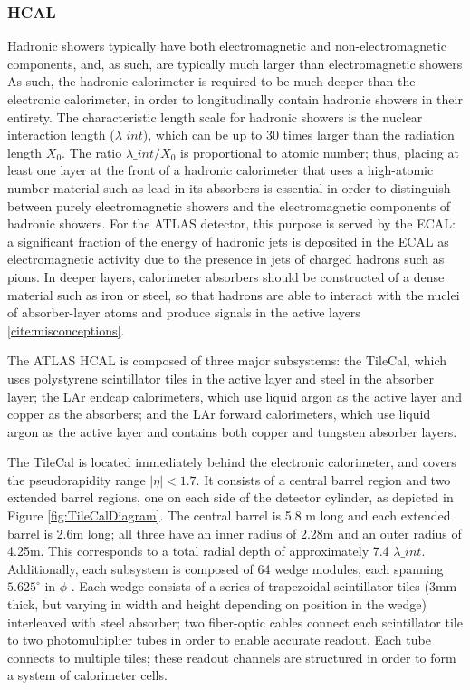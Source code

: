 \subsubsection{HCAL} \label{sec:HCAL} 

Hadronic showers typically have both electromagnetic and non-electromagnetic components, and, as such, are typically much larger than electromagnetic showers  As such, the hadronic calorimeter is required to be much deeper than the electronic calorimeter, in order to longitudinally contain hadronic showers in their entirety. The characteristic length scale for hadronic showers is the nuclear interaction length ($\lambda\_{int}$), which can be up to 30 times larger than the radiation length $X_0$. The ratio $\lambda\_{int} / X_0 $ is proportional to atomic number; thus, placing at least one layer at the front of a hadronic calorimeter that uses a high-atomic number material such as lead in its absorbers is essential in order to distinguish between purely electromagnetic showers and the electromagnetic components of hadronic showers. For the ATLAS detector, this purpose is served by the ECAL: a significant fraction of the energy of hadronic jets is deposited in the ECAL as electromagnetic activity due to the presence in jets of charged hadrons such as pions. In deeper layers, calorimeter absorbers should be constructed of a dense material such as iron or steel, so that hadrons are able to interact with the nuclei of absorber-layer atoms and produce signals in the active layers \ref{cite:misconceptions}.  

The ATLAS HCAL is composed of three major subsystems: the TileCal, which uses polystyrene scintillator tiles in the active layer and steel in the absorber layer; the LAr endcap calorimeters, which use liquid argon as the active layer and copper as the absorbers; and the LAr forward calorimeters, which use liquid argon as the active layer and contains both copper and tungsten absorber layers.

The TileCal is located immediately behind the electronic calorimeter, and covers the pseudorapidity range $|\eta |< 1.7$. It consists of a central barrel region and two extended barrel regions, one on each side of the detector cylinder, as depicted in Figure \ref{fig:TileCalDiagram}. The central barrel is 5.8 m long and each extended barrel is 2.6m long; all three have an inner radius of 2.28m and an outer radius of 4.25m. This corresponds to a total radial depth of approximately 7.4 $\lambda\_{int}$. Additionally, each subsystem is composed of 64 wedge modules, each spanning $5.625 ^{\circ}$ in $\phi$ . Each wedge consists of a series of trapezoidal scintillator tiles (3mm thick, but varying in width and height depending on position in the wedge) interleaved with steel absorber; two fiber-optic cables connect each scintillator tile to two photomultiplier tubes in order to enable accurate readout. Each tube connects to multiple tiles; these readout channels are structured in order to form a system of calorimeter cells. 

